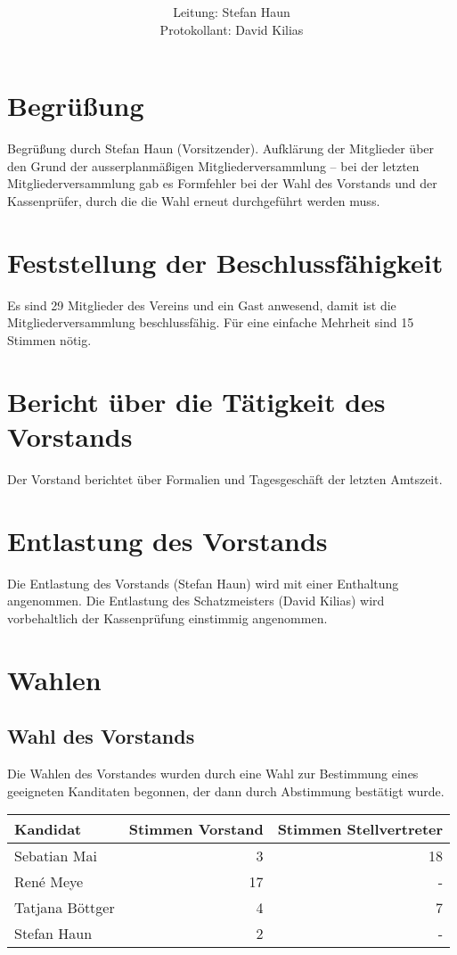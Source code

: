 \documentclass[a4paper,12pt,titlepage]{scrartcl}
\title{ \logo \\ \vspace{0.2\baselineskip} \thetitle}
\author{
Leitung: Stefan Haun \\
Protokollant: David Kilias
}
\date{\displaydate{date}} %
\begin{document}
\maketitle
\tableofcontents

\clearpage
\section*{Begrüßung}
Begrüßung durch Stefan Haun (Vorsitzender).
Aufklärung der Mitglieder über den Grund der ausserplanmäßigen Mitgliederversammlung – bei der letzten Mitgliederversammlung gab es Formfehler bei der Wahl des Vorstands und der Kassenprüfer, durch die die Wahl erneut durchgeführt werden muss.

\section{Feststellung der Beschlussfähigkeit}
Es sind 29 Mitglieder des Vereins und ein Gast anwesend, damit ist die Mitgliederversammlung beschlussfähig. Für eine einfache Mehrheit sind 15 Stimmen nötig.

\section{Bericht über die Tätigkeit des Vorstands}
Der Vorstand berichtet über Formalien und Tagesgeschäft der letzten Amtszeit.

\section{Entlastung des Vorstands}
Die Entlastung des Vorstands (Stefan Haun) wird mit einer Enthaltung angenommen.
Die Entlastung des Schatzmeisters (David Kilias) wird vorbehaltlich der Kassenprüfung einstimmig angenommen.

\section{Wahlen}
\subsection{Wahl des Vorstands}
Die Wahlen des Vorstandes wurden durch eine Wahl zur Bestimmung eines geeigneten Kanditaten begonnen, der dann durch Abstimmung bestätigt wurde.

\begin{center}
	\begin{tabular}{l | r | r}
			Kandidat & Stimmen Vorstand & Stimmen Stellvertreter \\ \hline
			Sebatian Mai & 3 & 18 \\
			René Meye & 17 & - \\
			Tatjana Böttger & 4 & 7 \\
			Stefan Haun & 2 & - \\
		\end{tabular}
\end{center}
\end{document}

